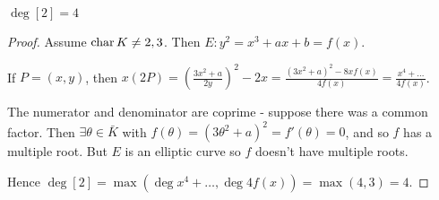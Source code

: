 \documentclass[10pt,a4paper]{article}
\begin{document}
\begin{lemma}
  $\deg[2] = 4$
\end{lemma}
\begin{proof}
  Assume $\operatorname{char} K \neq 2, 3$. Then $E: y^2=x^3+ax+b=f(x)$.

  If $P = (x,y)$, then $x(2P) = \left(\frac{3x^2+a}{2y}\right)^2-2x = \frac{(3x^2+a)^2-8xf(x)}{4f(x)} = \frac{x^4+\ldots}{4f(x)}$.

  The numerator and denominator are coprime - suppose there was a common factor. Then $\exists \theta \in \bar{K}$ with $f(\theta) = (3\theta^2+a)^2 = f'(\theta) = 0$, and so $f$ has a multiple root. But $E$ is an elliptic curve so $f$ doesn't have multiple roots.

  Hence $\deg [2] = \max(\deg x^4+\ldots, \deg 4f(x)) = \max(4, 3) = 4$.
\end{proof}
\end{document}

